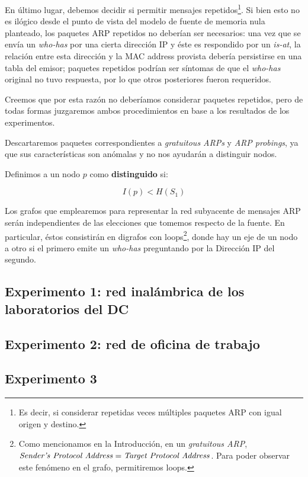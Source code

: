 \par En último lugar, debemos decidir si permitir mensajes repetidos\footnote{Es decir, si considerar repetidas veces múltiples paquetes ARP con igual origen y destino.}. 
Si bien esto no es ilógico desde el punto de vista del modelo de fuente de memoria nula planteado, los paquetes ARP repetidos no deberían ser necesarios: una vez que se envía un \textit{who-has} por una cierta dirección IP y éste es respondido por un \textit{is-at}, la relación entre esta dirección y la MAC address provista debería persistirse en una tabla del emisor; paquetes repetidos podrían ser síntomas de que el \textit{who-has} original no tuvo respuesta, por lo que otros posteriores fueron requeridos.

\par Creemos que por esta razón no deberíamos considerar paquetes repetidos, pero de todas formas juzgaremos ambos procedimientos en base a los resultados de los experimentos.

\par Descartaremos paquetes correspondientes a \textit{gratuitous ARPs} y \textit{ARP probings}, ya que sus características son anómalas y no nos ayudarán a distinguir nodos.

\par Definimos a un nodo $p$ como \textbf{distinguido} si:

\begin{equation*}
    I(p) < H(S_1)
\end{equation*}

\par Los grafos que emplearemos para representar la red subyacente de mensajes ARP serán independientes de las elecciones que tomemos respecto de la fuente.
En particular, éstos consistirán en digrafos con loops\footnote{Como mencionamos en la Introducción, en un \textit{gratuitous ARP}, $\text{\textit{Sender's Protocol Address}} = \text{\textit{Target Protocol Address}}$. Para poder observar este fenómeno en el grafo, permitiremos loops.}, donde hay un eje de un nodo a otro si el primero emite un \textit{who-has} preguntando por la Dirección IP del segundo.
 
\subsection{Experimento 1: red inalámbrica de los laboratorios del DC}

\subsection{Experimento 2: red de oficina de trabajo}

\subsection{Experimento 3}

